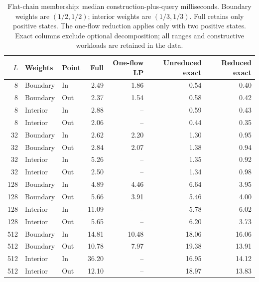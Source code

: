 \begin{table}[tb]\centering\small
\caption{Flat-chain membership: median construction-plus-query milliseconds. Boundary weights are $(1/2,1/2)$; interior weights are $(1/3,1/3)$. Full retains only positive states. The one-flow reduction applies only with two positive states. Exact columns exclude optional decomposition; all ranges and constructive workloads are retained in the data.}
\label{tab:computation-flat}
\begin{tabular}{rllrrrr}\toprule
$L$ & Weights & Point & Full & One-flow LP & Unreduced exact & Reduced exact\\\midrule
8 & Boundary & In & 2.49 & 1.86 & 0.54 & 0.40 \\
8 & Boundary & Out & 2.37 & 1.54 & 0.58 & 0.42 \\
8 & Interior & In & 2.88 & -- & 0.59 & 0.43 \\
8 & Interior & Out & 2.06 & -- & 0.44 & 0.35 \\
32 & Boundary & In & 2.62 & 2.20 & 1.30 & 0.95 \\
32 & Boundary & Out & 2.84 & 2.07 & 1.38 & 0.94 \\
32 & Interior & In & 5.26 & -- & 1.35 & 0.92 \\
32 & Interior & Out & 2.50 & -- & 1.34 & 0.98 \\
128 & Boundary & In & 4.89 & 4.46 & 6.64 & 3.95 \\
128 & Boundary & Out & 5.66 & 3.91 & 5.46 & 4.00 \\
128 & Interior & In & 11.09 & -- & 5.78 & 6.02 \\
128 & Interior & Out & 5.65 & -- & 6.20 & 3.73 \\
512 & Boundary & In & 14.81 & 10.48 & 18.06 & 16.06 \\
512 & Boundary & Out & 10.78 & 7.97 & 19.38 & 13.91 \\
512 & Interior & In & 36.20 & -- & 16.95 & 14.12 \\
512 & Interior & Out & 12.10 & -- & 18.97 & 13.83 \\
\bottomrule\end{tabular}\end{table}
